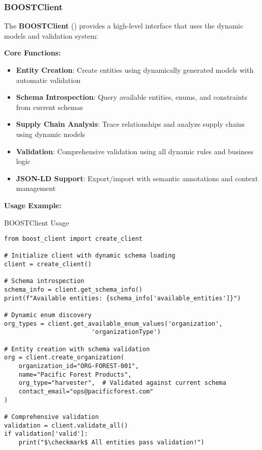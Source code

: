 \subsubsection{BOOSTClient}
\label{sec:python-client}

The \textbf{BOOSTClient} () provides a high-level interface that uses the dynamic models and validation system:

\textbf{Core Functions:}
\begin{itemize}
    \item \textbf{Entity Creation}: Create entities using dynamically generated models with automatic validation
    \item \textbf{Schema Introspection}: Query available entities, enums, and constraints from current schemas
    \item \textbf{Supply Chain Analysis}: Trace relationships and analyze supply chains using dynamic models
    \item \textbf{Validation}: Comprehensive validation using all dynamic rules and business logic
    \item \textbf{JSON-LD Support}: Export/import with semantic annotations and context management
\end{itemize}

\textbf{Usage Example:}

\begin{pythonexample}{BOOSTClient Usage}
\begin{verbatim}
from boost_client import create_client

# Initialize client with dynamic schema loading
client = create_client()

# Schema introspection
schema_info = client.get_schema_info()
print(f"Available entities: {schema_info['available_entities']}")

# Dynamic enum discovery
org_types = client.get_available_enum_values('organization', 
                        'organizationType')

# Entity creation with schema validation
org = client.create_organization(
    organization_id="ORG-FOREST-001",
    name="Pacific Forest Products",
    org_type="harvester",  # Validated against current schema
    contact_email="ops@pacificforest.com"
)

# Comprehensive validation
validation = client.validate_all()
if validation['valid']:
    print("$\checkmark$ All entities pass validation!")
\end{verbatim}
\end{pythonexample}

